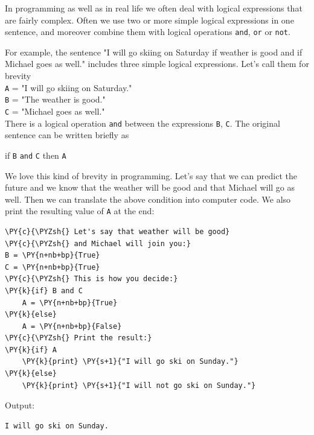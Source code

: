 In programming as well as in real life we often deal with logical expressions that are 
fairly complex. Often we use two or more simple logical expressions in one sentence, 
and moreover combine them with logical operations {\tt and}, {\tt or} or {\tt not}.

For example, the sentence "I will go skiing on Saturday if weather is good and if 
Michael goes as well." includes three simple logical expressions. Let's call 
them for brevity\\

\noindent
{\tt A} = "I will go skiing on Saturday."\\
{\tt B} = "The weather is good."\\
{\tt C} = "Michael goes as well."\\

\noindent
There is a logical operation {\tt and} between the expressions {\tt B}, {\tt C}.
The original sentence can be written briefly as \\

\centerline{
if {\tt B} {\tt and} {\tt C} then {\tt A}
}
\vspace{4mm}
\noindent
We love this kind of brevity in programming. Let's say that we can 
predict the future and we know that the weather will be good and that 
Michael will go as well. Then we can translate the above condition 
into computer code. We also print the resulting value of {\tt A}
at the end:\\

\begin{bbox}
\begin{Verbatim}[commandchars=\\\{\}]
\PY{c}{\PYZsh{} Let's say that weather will be good}
\PY{c}{\PYZsh{} and Michael will join you:}
B = \PY{n+nb+bp}{True}
C = \PY{n+nb+bp}{True}
\PY{c}{\PYZsh{} This is how you decide:}
\PY{k}{if} B and C
    A = \PY{n+nb+bp}{True}
\PY{k}{else}
    A = \PY{n+nb+bp}{False}
\PY{c}{\PYZsh{} Print the result:}
\PY{k}{if} A
    \PY{k}{print} \PY{s+1}{"I will go ski on Sunday."}
\PY{k}{else}
    \PY{k}{print} \PY{s+1}{"I will not go ski on Sunday."}
\end{Verbatim}
\end{bbox}
\vspace{6mm}

\noindent
Output:\\

\begin{ybox}
\begin{Verbatim}[commandchars=\\\{\}]
I will go ski on Sunday.
\end{Verbatim}
\end{ybox}

